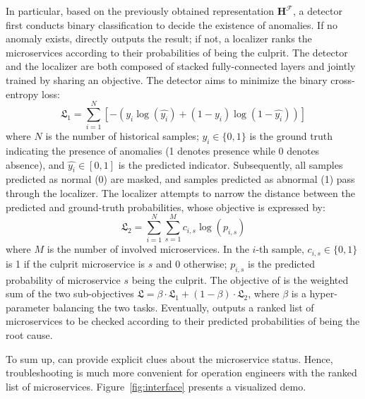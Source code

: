 In particular, based on the previously obtained representation $\boldsymbol{H}^\mathcal{F}$, a detector first conducts binary classification to decide the existence of anomalies.
If no anomaly exists, \name directly outputs the result; if not, a localizer ranks the microservices according to their probabilities of being the culprit.
The detector and the localizer are both composed of stacked fully-connected layers and jointly trained by sharing an objective.
The detector aims to minimize the binary cross-entropy loss:
\begin{equation}\label{eq:loss-detection}
    \mathfrak{L}_1 = \sum_{i=1}^N [-(y_i\log(\hat{y_i}) + (1-y_i)\log(1-\hat{y_i}))]
\end{equation}
where $N$ is the number of historical samples; $y_i \in \{0,1\}$ is the ground truth indicating the presence of anomalies (1 denotes presence while 0 denotes absence), and $\hat{y_i} \in [0,1]$ is the predicted indicator.
Subsequently, all samples predicted as normal (0) are masked, and samples predicted as abnormal (1) pass through the localizer. 
The localizer attempts to narrow the distance between the predicted and ground-truth probabilities, whose objective is expressed by:
\begin{equation}\label{eq:loss-localization}
    \mathfrak{L}_2 = \sum_{i=1}^N \sum_{s=1}^M c_{i, s} \log (p_{i,s})
\end{equation}
where $M$ is the number of involved microservices. In the $i$-th sample, $c_{i,s} \in \{0,1\}$ is 1 if the culprit microservice is $s$ and 0 otherwise; $p_{i,s}$ is the predicted probability of microservice $s$ being the culprit.
The objective of \name is the weighted sum of the two sub-objectives $\mathfrak{L} = \beta \cdot \mathfrak{L}_1 + (1-\beta) \cdot \mathfrak{L}_2$, where $\beta$ is a hyper-parameter balancing the two tasks.
Eventually, \name outputs a ranked list of microservices to be checked according to their predicted probabilities of being the root cause.

To sum up, \name can provide explicit clues about the microservice status. Hence, troubleshooting is much more convenient for operation engineers with the ranked list of microservices.
Figure~\ref{fig:interface} presents a visualized demo.

